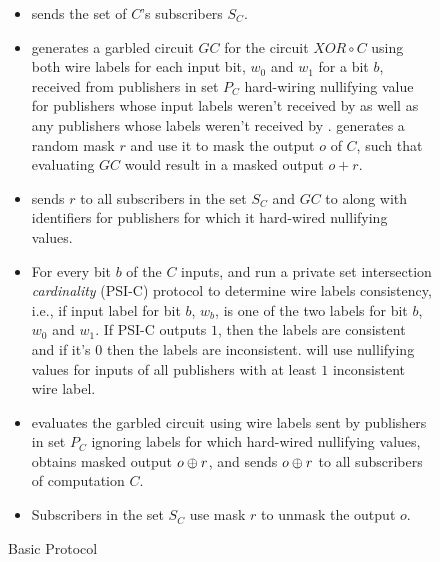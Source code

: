 \begin{figure*}[h]
\begin{mdframed}[style=myframe]
\begin{itemize}[leftmargin=18pt,itemsep=4pt,topsep=4pt]
	\item \broker sends \garbler the set of $C$'s subscribers $S_C$.
		
	\item \garbler generates a garbled circuit $GC$ for the circuit $XOR \circ C$
		using both wire labels for each input bit, $w_0$ and $w_1$ for a bit $b$,
		received from publishers in set $P_C$ hard-wiring nullifying value for
		publishers whose input labels weren't received by \broker as well as any
		publishers whose labels weren't received by \garbler. \garbler generates a
		random mask $r$ and use it to mask the output $o$ of $C$, such that
		evaluating $GC$ would result in a masked output $o+r$.
		
	\item \garbler sends $r$ to all subscribers in the set $S_C$ and $GC$ to
		\broker along with identifiers for publishers for which it hard-wired
		nullifying values.

	\item For every bit $b$ of the $C$ inputs, \garbler and \broker run a private
		set intersection \emph{cardinality} (PSI-C) protocol to determine wire
		labels consistency, i.e., if \broker input label for bit $b$, $w_b$, is one
		of the two \garbler labels for bit $b$, $w_0$ and $w_1$. If PSI-C outputs
		$1$, then the labels are consistent and if it's $0$ then the labels are
		inconsistent. \garbler will use nullifying values for inputs of all
		publishers with at least $1$ inconsistent wire label. 
		
	\item \broker evaluates the garbled circuit using wire labels sent by
		publishers in set $P_C$ ignoring labels for which \garbler hard-wired
		nullifying values, obtains masked output $o \oplus r$, and sends $o \oplus r$
		to all subscribers of computation $C$.
  
	\item Subscribers in the set $S_C$ use mask $r$ to unmask the output $o$.

\end{itemize}

\end{mdframed}
\caption{Basic Protocol}
\label{fig:basicprotocol}
\end{figure*}


